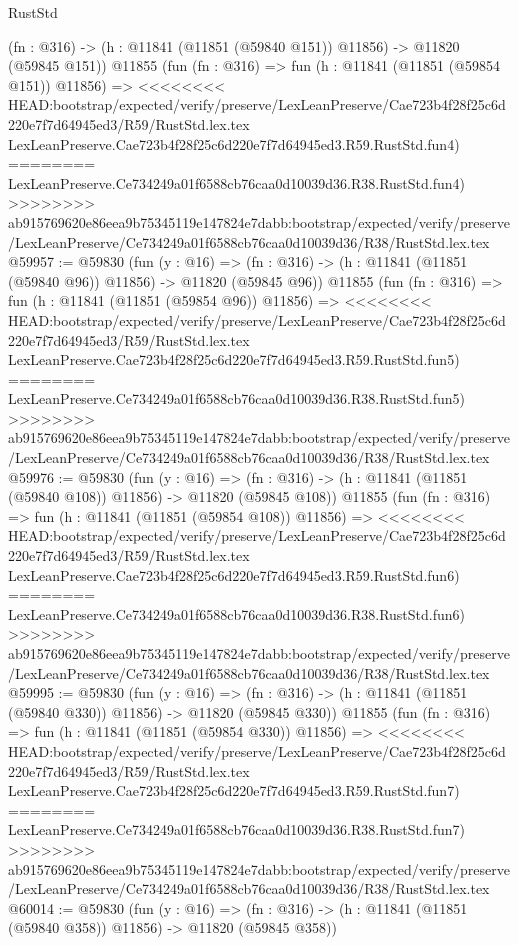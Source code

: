 \begin{lexlean}{RustStd}
\begin{coremodule}
{\begin{coremodule}
{{{{{{{{{{{{{{{{{{{{{{{{{{{{{{{{{{{{{{{{{{{{{{{{{{    (fn : @316) -> (h : @11841 (@11851 (@59840 @151)) @11856) -> @11820 (@59845 @151))
    @11855
    (fun (fn : @316) =>
    fun (h : @11841 (@11851 (@59854 @151)) @11856) =>
<<<<<<<< HEAD:bootstrap/expected/verify/preserve/LexLeanPreserve/Cae723b4f28f25c6d220e7f7d64945ed3/R59/RustStd.lex.tex
    LexLeanPreserve.Cae723b4f28f25c6d220e7f7d64945ed3.R59.RustStd.fun4)
========
    LexLeanPreserve.Ce734249a01f6588cb76caa0d10039d36.R38.RustStd.fun4)
>>>>>>>> ab915769620e86eea9b75345119e147824e7dabb:bootstrap/expected/verify/preserve/LexLeanPreserve/Ce734249a01f6588cb76caa0d10039d36/R38/RustStd.lex.tex
@59957 := @59830
    (fun (y : @16) =>
    (fn : @316) -> (h : @11841 (@11851 (@59840 @96)) @11856) -> @11820 (@59845 @96))
    @11855
    (fun (fn : @316) =>
    fun (h : @11841 (@11851 (@59854 @96)) @11856) =>
<<<<<<<< HEAD:bootstrap/expected/verify/preserve/LexLeanPreserve/Cae723b4f28f25c6d220e7f7d64945ed3/R59/RustStd.lex.tex
    LexLeanPreserve.Cae723b4f28f25c6d220e7f7d64945ed3.R59.RustStd.fun5)
========
    LexLeanPreserve.Ce734249a01f6588cb76caa0d10039d36.R38.RustStd.fun5)
>>>>>>>> ab915769620e86eea9b75345119e147824e7dabb:bootstrap/expected/verify/preserve/LexLeanPreserve/Ce734249a01f6588cb76caa0d10039d36/R38/RustStd.lex.tex
@59976 := @59830
    (fun (y : @16) =>
    (fn : @316) -> (h : @11841 (@11851 (@59840 @108)) @11856) -> @11820 (@59845 @108))
    @11855
    (fun (fn : @316) =>
    fun (h : @11841 (@11851 (@59854 @108)) @11856) =>
<<<<<<<< HEAD:bootstrap/expected/verify/preserve/LexLeanPreserve/Cae723b4f28f25c6d220e7f7d64945ed3/R59/RustStd.lex.tex
    LexLeanPreserve.Cae723b4f28f25c6d220e7f7d64945ed3.R59.RustStd.fun6)
========
    LexLeanPreserve.Ce734249a01f6588cb76caa0d10039d36.R38.RustStd.fun6)
>>>>>>>> ab915769620e86eea9b75345119e147824e7dabb:bootstrap/expected/verify/preserve/LexLeanPreserve/Ce734249a01f6588cb76caa0d10039d36/R38/RustStd.lex.tex
@59995 := @59830
    (fun (y : @16) =>
    (fn : @316) -> (h : @11841 (@11851 (@59840 @330)) @11856) -> @11820 (@59845 @330))
    @11855
    (fun (fn : @316) =>
    fun (h : @11841 (@11851 (@59854 @330)) @11856) =>
<<<<<<<< HEAD:bootstrap/expected/verify/preserve/LexLeanPreserve/Cae723b4f28f25c6d220e7f7d64945ed3/R59/RustStd.lex.tex
    LexLeanPreserve.Cae723b4f28f25c6d220e7f7d64945ed3.R59.RustStd.fun7)
========
    LexLeanPreserve.Ce734249a01f6588cb76caa0d10039d36.R38.RustStd.fun7)
>>>>>>>> ab915769620e86eea9b75345119e147824e7dabb:bootstrap/expected/verify/preserve/LexLeanPreserve/Ce734249a01f6588cb76caa0d10039d36/R38/RustStd.lex.tex
@60014 := @59830
    (fun (y : @16) =>
    (fn : @316) -> (h : @11841 (@11851 (@59840 @358)) @11856) -> @11820 (@59845 @358))
}}}}}}}}}}}}}}}}}}}}}}}}}}}}}}}}}}}}}}}}}}}}}}}}}}
\end{coremodule}}
\end{coremodule}
\end{lexlean}
